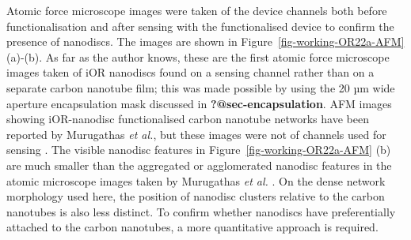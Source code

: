 \documentclass[
  a4paper,
]{scrbook}
\begin{document}
Atomic force microscope images were taken of the device channels both
before functionalisation and after sensing with the functionalised
device to confirm the presence of nanodiscs. The images are shown in
Figure~\ref{fig-working-OR22a-AFM} (a)-(b). As far as the author knows,
these are the first atomic force microscope images taken of iOR
nanodiscs found on a sensing channel rather than on a separate carbon
nanotube film; this was made possible by using the 20 µm wide aperture
encapsulation mask discussed in \textbf{?@sec-encapsulation}. AFM images
showing iOR-nanodisc functionalised carbon nanotube networks have been
reported by Murugathas \emph{et al.}, but these images were not of
channels used for sensing \autocite{Murugathas2019a}. The visible
nanodisc features in Figure~\ref{fig-working-OR22a-AFM} (b) are much
smaller than the aggregated or agglomerated nanodisc features in the
atomic microscope images taken by Murugathas \emph{et al.}
\autocite{Murugathas2019a}. On the dense network morphology used here,
the position of nanodisc clusters relative to the carbon nanotubes is
also less distinct. To confirm whether nanodiscs have preferentially
attached to the carbon nanotubes, a more quantitative approach is
required.
\end{document}
